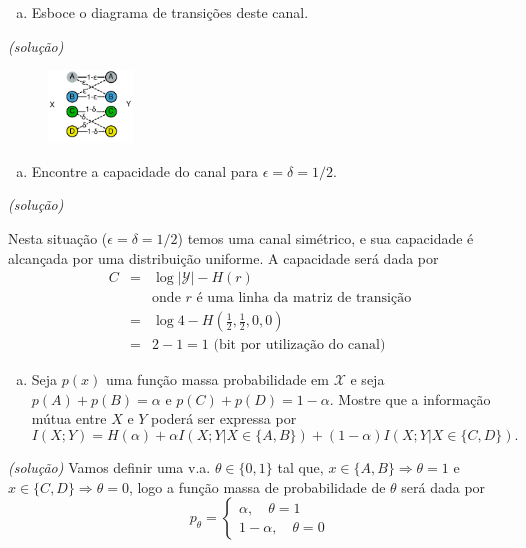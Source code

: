 \begin{frame}[allowframebreaks]
\begin{exercise}
  \exercisebreak
  
  \begin{enumerate}[a)]
  \item Esboce o diagrama de transições deste canal.
  \end{enumerate}
  \textit{(solução)}

  \begin{figure}[h!]
  \centering
  \includegraphics[width=0.2\textwidth]{images/pchannel.pdf}
  \label{fig:pchannel}
  \end{figure}


  \exercisebreak

  \begin{enumerate}[b)]
  \item Encontre a capacidade do canal para $\epsilon = \delta = 1/2$.
  \end{enumerate}
  \textit{(solução)}

  Nesta situação ($\epsilon = \delta = 1/2$) temos uma canal simétrico, e sua capacidade
  é alcançada por uma distribuição uniforme. A capacidade será dada por
  \begin{eqnarray}
  C &=& \log \vert \mathcal{Y} \vert - H(r) \\
	&& \text{onde } r \text{ é uma linha da matriz de transição} \nonumber \\
	&=& \log 4 - H(\frac{1}{2}, \frac{1}{2}, 0, 0) \nonumber \\
	&=& 2 - 1 = 1 \text{ (bit por utilização do canal)} \nonumber
  \end{eqnarray}   

  \exercisebreak

  \begin{enumerate}[c)]
  \item Seja $p(x)$ uma função massa probabilidade em $\mathcal{X}$ e seja
  $p(A)+p(B) = \alpha$ e $p(C)+p(D)=1-\alpha$.
  Mostre que a informação mútua entre $X$ e $Y$ poderá ser expressa por
  \begin{equation}
  I(X;Y) = H(\alpha) + \alpha I(X;Y | X \in \{A,B\}) + (1-\alpha) I(X;Y|X \in \{C,D\}).
  \end{equation}
  \end{enumerate}
  \textit{(solução)}
  Vamos definir uma v.a. $\theta \in \{0,1\}$ tal que, 
  $x \in \{A,B\} \Rightarrow \theta = 1$ e 
  $x \in \{C,D\} \Rightarrow \theta = 0$, logo a função massa de probabilidade de $\theta$
  será dada por
  \begin{equation}
  p_\theta = \begin{cases} \alpha, \quad \theta = 1  \\ 1-\alpha, \quad \theta = 0 \end{cases}
  \end{equation}


\end{exercise}
\end{frame}
